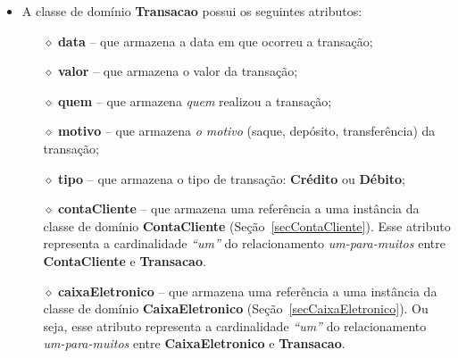 \begin{itemize}

\item A classe de domínio {\bf Transacao} possui os seguintes atributos:

\vspace{0.3cm}

\begin{itemize}

\item[$\diamond$] {\bf data} -- que armazena a data em que ocorreu a transação; 

\vspace{0.3cm}

\item[$\diamond$] {\bf valor} -- que armazena o valor da transação; 

\vspace{0.3cm}

\item[$\diamond$] {\bf quem} -- que armazena {\em quem} realizou a transação; 

\vspace{0.3cm}

\item[$\diamond$] {\bf motivo} -- que  armazena {\em o motivo} (saque, depósito,
  transferência) da transação;

\vspace{0.3cm}

\item[$\diamond$] {\bf tipo} -- que  armazena o tipo de transação: {\bf Crédito}
  ou {\bf Débito};

\vspace{0.3cm}

\item[$\diamond$]  {\bf  contaCliente} --  que  armazena  uma  referência a  uma
  instância      da      classe      de     domínio      {\bf      ContaCliente}
  (Seção~\ref{secContaCliente}).  Esse atributo  representa a cardinalidade {\em
    ``um''} do  relacionamento {\em  um-para-muitos} entre {\bf  ContaCliente} e
  {\bf Transacao}. 

\vspace{0.3cm}

\item[$\diamond$]  {\bf caixaEletronico} --  que armazena  uma referência  a uma
  instância     da      classe     de     domínio      {\bf     CaixaEletronico}
  (Seção~\ref{secCaixaEletronico}).   Ou   seja,  esse  atributo   representa  a
  cardinalidade {\em  ``um''} do relacionamento {\em  um-para-muitos} entre {\bf
    CaixaEletronico} e {\bf Transacao}. 

\end{itemize}

\end{itemize}

